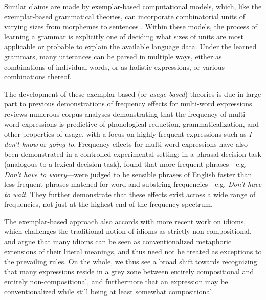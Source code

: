 \documentclass[authoryear]{elsarticle}
\begin{document}
Similar claims are made by exemplar-based computational models, which, like the exemplar-based grammatical theories, can incorporate combinatorial units of varying sizes from morphemes to sentences \citep[e.g.][]{Bod:1998tx,Bod:2003uw, Bod:2008uc, Johnson:2007wl, ODonnell:2011vh}. Within these models, the process of learning a grammar is explicitly one of deciding what sizes of units are most applicable or probable to explain the available language data. Under the learned grammars, many utterances can be parsed in multiple ways, either as combinations of individual words, or as holistic expressions, or various combinations thereof.

The development of these exemplar-based (or \emph{usage-based}) theories is due in large part to previous demonstrations of frequency effects for multi-word expressions. \citet{Bybee:2006ul} reviews numerous corpus analyses demonstrating that the frequency of multi-word expressions is predictive of phonological reduction, grammaticalization, and other properties of usage, with a focus on highly frequent expressions such as \emph{I don't know} or \emph{going to}. Frequency effects for multi-word expressions have also been demonstrated in a controlled experimental setting: in a phrasal-decision task (analogous to a lexical decision task), \citet{Arnon:2010hz} found that more frequent phrases---e.g. \emph{Don't have to worry}---were judged to be sensible phrases of English faster than less frequent phrases matched for word and substring frequencies---e.g. \emph{Don't have to wait}. They further demonstrate that these effects exist across a wide range of frequencies, not just at the highest end of the frequency spectrum. 
	
The exemplar-based approach also accords with more recent work on idioms, which challenges the traditional notion of idioms as strictly non-compositional. \citet{Gibbs:1990wh} and \citet{Nunberg:1994uc} argue that many idioms can be seen as conventionalized metaphoric extensions of their literal meanings, and thus need not be treated as exceptions to the prevailing rules. On the whole, we thus see a broad shift towards recognizing that many expressions reside in a grey zone between entirely compositional and entirely non-compositional, and furthermore that an expression may be conventionalized while still being at least somewhat compositional.
\end{document}
